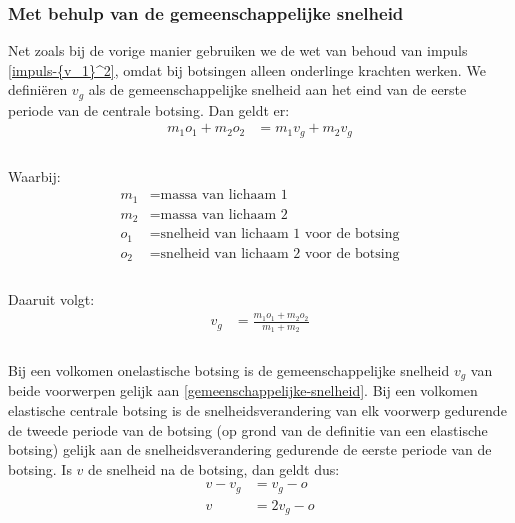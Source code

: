 \documentclass[12pt,a4paper]{article}
\begin{document}
	\subsubsection{Met behulp van de gemeenschappelijke snelheid}
	Net zoals bij de vorige manier gebruiken we de wet van behoud van impuls \eqref{impuls-{v_1}^2}, omdat bij botsingen alleen onderlinge krachten werken. We defini\"{e}ren $v_g$ als de gemeenschappelijke snelheid  aan het eind van de eerste periode van de centrale botsing. Dan geldt er:
	\begin{equation}
		\begin{aligned}
			m_1o_1+m_2o_2&=m_1v_g+m_2v_g\\
		\end{aligned}
	\end{equation}
	\\Waarbij:
	\begin{equation}
		\begin{aligned}
			m_1 &= \text{massa van lichaam 1}\\
			m_2 &= \text{massa van lichaam 2}\\
			o_1 &= \text{snelheid van lichaam 1 voor de botsing}\\
			o_2 &= \text{snelheid van lichaam 2 voor de botsing}\\
		\end{aligned}
	\end{equation}
	\\Daaruit volgt:
	\begin{equation}
		\begin{aligned}
		\label{gemeenschappelijke-snelheid}
			v_g&=\frac{m_1o_1+m_2o_2}{m_1+m_2}\\
		\end{aligned}
	\end{equation}
	\\Bij een volkomen onelastische botsing is de gemeenschappelijke snelheid $v_g$ van beide voorwerpen gelijk aan \eqref{gemeenschappelijke-snelheid}. Bij een volkomen elastische centrale botsing is de snelheidsverandering van elk voorwerp gedurende de tweede periode van de botsing (op grond van de definitie van een elastische botsing) gelijk aan de snelheidsverandering gedurende de eerste periode van de botsing.
	Is $v$ de snelheid na de botsing, dan geldt dus:
	\begin{equation}
		\begin{aligned}
			v-v_g&=v_g-o\\
			v&=2v_g-o\\
		\end{aligned}
	\end{equation}
\end{document}
